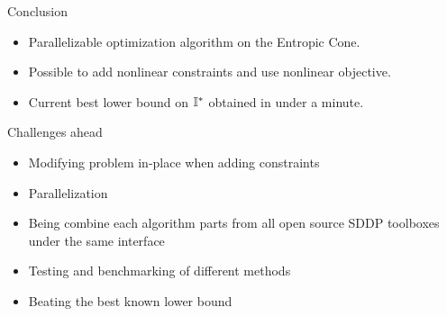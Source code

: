 \documentclass[10pt,svgnames,usenames,table]{beamer}
\begin{document}
  \begin{frame}{Conclusion}
    \begin{itemize}
      \item Parallelizable optimization algorithm on the Entropic Cone.
      \item Possible to add nonlinear constraints and use nonlinear objective.
      \item Current best lower bound on $\mathbb{I}^*$ obtained in under a minute.
    \end{itemize}
    \begin{block}{Challenges ahead}
      \begin{itemize}
        \item Modifying problem in-place when adding constraints
        \item Parallelization
        \item Being combine each algorithm parts from all open source SDDP toolboxes under the same interface
        \item Testing and benchmarking of different methods
        \item Beating the best known lower bound
      \end{itemize}
    \end{block}
  \end{frame}
\end{document}
